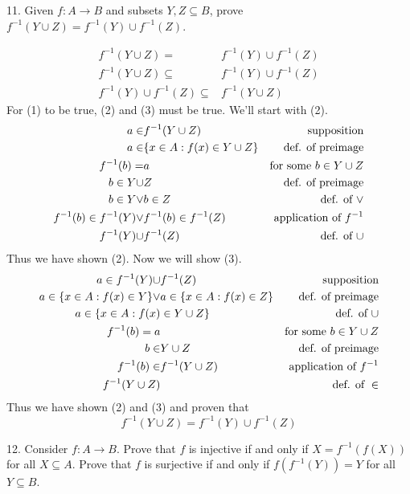 \documentclass{idrisMemo}
\begin{document}
\begin{prooflist}{11. Given $f: A \rightarrow B$ and subsets $Y, Z \subseteq B$,
    prove $f^{-1}(Y \cup Z)=f^{-1}(Y) \cup f^{-1}(Z)$.}
\item \imagedef{}
\setcounter{equation}{0}
\begin{align}
    f^{-1}(Y \cup Z)=&f^{-1}(Y) \cup f^{-1}(Z)\\
    f^{-1}(Y \cup Z)\subseteq &f^{-1}(Y) \cup f^{-1}(Z)\\
    f^{-1}(Y) \cup f^{-1}(Z) \subseteq & f^{-1}(Y \cup Z)
\end{align}
For (1) to be true, (2) and (3) must be true. We'll start with (2).
\begin{align}
    a\in& f^{-1}(Y\cup Z) &\text{supposition}\\
    a\in& \{x \in A: f(x) \in Y\cup Z\} &\text{def. of preimage}\\
    f^{-1}(b) =& a & \text{for some }b\in Y\cup Z\\
    b \in Y \cup& Z &\text{def. of preimage}\\
    b \in Y \lor & b \in Z &\text{def. of }\lor \\
    f^{-1}(b) \in f^{-1}(Y) \lor& f^{-1}(b) \in f^{-1}(Z)&\text{application of }f^{-1}\\
    f^{-1}(Y) \cup & f^{-1}(Z)&\text{def. of }\cup
\end{align}
Thus we have shown (2). Now we will show (3).
\begin{align}
    a\in f^{-1}(Y) \cup& f^{-1}(Z) &\text{supposition}\\
    a\in \{x \in A: f(x) \in Y\} \lor& a\in \{x \in A: f(x) \in Z\} &\text{def. of preimage}\\
    a\in \{x \in A: f(x) &\in Y\cup Z\} &\text{def. of }\cup\\
    f^{-1}(b) = a& &\text{for some }b\in Y\cup Z\\
    b \in& Y \cup Z &\text{def. of preimage}\\
    f^{-1}(b) \in& f^{-1}(Y\cup Z)&\text{application of }f^{-1}\\
    f^{-1}(Y\cup Z)&&\text{def. of }\in
\end{align}
Thus we have shown (2) and (3) and proven that
\[
    f^{-1}(Y \cup Z)=f^{-1}(Y) \cup f^{-1}(Z)
\]
\end{prooflist}

\begin{prooflist}{12. Consider $f: A \rightarrow B$. Prove that $f$ is injective
    if and only if $X=f^{-1}(f(X))$ for all $X \subseteq A$. Prove that $f$ is
surjective if and only if $f\left(f^{-1}(Y)\right)=Y$ for all $Y \subseteq B$.}
\item \imagedef{}
\inj{}
\surj{}
\end{prooflist}
\end{document}
